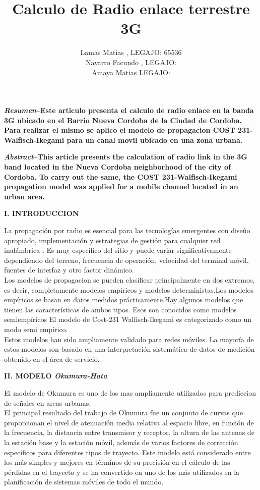 \documentclass[10pt,a4paper]{article}
\author{Lamas Matias , LEGAJO: 65536\\ Navarro Facundo , LEGAJO:  \\Amaya Matias LEGAJO: \\ }
\title{\textbf{Calculo de Radio enlace terrestre 3G}}
\date{} %
\begin{document}
\maketitle  %
\begin{multicols}{2} %


\textbf{\textit{Resumen}--Este articulo presenta el calculo de  radio enlace en la banda 3G ubicado en el Barrio Nueva Cordoba de la Ciudad de Cordoba. Para realizar el mismo   se aplico el modelo de propagacion COST 231-Walfisch-Ikegami para un canal movil ubicado en una zona urbana.}

\textbf{\textit{Abstract}--This article presents the calculation of radio link in the 3G band located in the Nueva Cordoba neighborhood of the city of Cordoba. To carry out the same, the COST 231-Walfisch-Ikegami propagation model was applied for a mobile channel located in an urban area.}

\begin{center}  %
\textbf{I. INTRODUCCION}
\end{center} %
La propagación por radio  es esencial para las tecnologías emergentes con diseño apropiado, implementación y estrategias de gestión para cualquier red inalámbrica . Es muy específico del sitio y puede variar significativamente dependiendo del terreno, frecuencia de operación, velocidad del terminal móvil, fuentes de interfaz y otro factor dinámico.\\%
Los modelos de propagacion  se pueden clasificar principalmente en dos extremos, es decir, completamente modelos empíricos y modelos deterministas.Los modelos empíricos se basan en datos medidos prácticamente.Hay algunos modelos que tienen las características de ambos tipos. Esos son conocidos como modelos semiempíricos
El modelo de Cost-231 Walfisch-Ikegami es categorizado como un modo semi empírico.\\
Estos modelos han sido ampliamente validado para redes móviles. La mayoría de estos modelos son basado en una interpretación sistemática de datos de medición obtenido en el área de servicio.\\

\begin{center}
\textbf{II. MODELO \textit{Okumura-Hata}}
\end{center}
El modelo de Okumura es uno de los mas ampliamente utilizados para prediccion de señales en areas urbanas.\\
El principal resultado del trabajo de Okumura fue un conjunto de curvas que proporcionan el nivel de atenuación media relativa al espacio libre, en función de la frecuencia, la distancia entre transmisor y receptor, la altura de las antenas de la estación base y
la estación móvil, además de varios factores de corrección específicos para diferentes tipos de trayecto. Este modelo está considerado entre los más simples y mejores en términos de su precisión en el cálculo de las pérdidas en el trayecto y se ha convertido en uno de los más utilizados en la planificación de sistemas móviles de todo el mundo.




\end{multicols}
\end{document}
